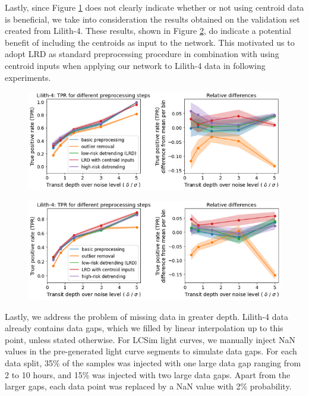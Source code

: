 Lastly, since Figure \ref{fig:preprocessing-general_lilith} does not clearly indicate whether or not using centroid data is beneficial, we take into consideration the results obtained on the validation set created from Lilith-4. These results, shown in Figure \ref{fig:preprocessing-general_lilith_valid}, do indicate a potential benefit of including the centroids as input to the network. This motivated us to adopt LRD as standard preprocessing procedure in combination with using centroid inputs when applying our network to Lilith-4 data in following experiments. 

\begin{figure}
    \centering
    \includegraphics[width=0.65\linewidth]{Experiments/Figures/Preprocessing/test_lilith_pp.png}
    \caption{}
    \label{fig:preprocessing-general_lilith}
\end{figure}

\begin{figure}
    \centering
    \includegraphics[width=0.65\linewidth]{Experiments/Figures/Preprocessing/validation_lilith_pp.png}
    \caption{}
    \label{fig:preprocessing-general_lilith_valid}
\end{figure}

Lastly, we address the problem of missing data in greater depth. Lilith-4 data already contains data gaps, which we filled by linear interpolation up to this point, unless stated otherwise. For LCSim light curves, we manually inject NaN values in the pre-generated light curve segments to simulate data gaps. For each data split, 35\% of the samples was injected with one large data gap ranging from 2 to 10 hours, and 15\% was injected with two large data gaps. Apart from the larger gaps, each data point was replaced by a NaN value with 2\% probability. 


